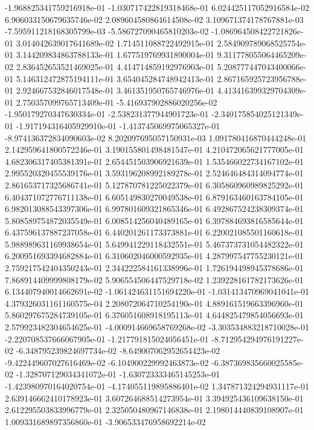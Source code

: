 -1.968825341759216918e-01
-1.030717422819318468e-01
6.024425117052916584e-02
6.906033150679635746e-02
2.089604580864614508e-02
3.109671374178767881e-03
-7.595911218168305799e-03
-5.586727090465810203e-02
-1.086964508422721826e-01
3.014042639017641689e-02
1.714511088722492915e-01
2.584909789068525754e-01
3.144209834863788133e-01
1.677519769931890004e-01
9.311778055064465209e-02
2.836452653521469025e-01
4.414714859192976903e-01
5.208777447043400066e-01
5.146312472875194111e-01
3.654045284748942413e-01
2.867165925723956788e-01
2.924667532846017548e-01
3.461351950765746976e-01
4.413416399329704309e-01
2.750357099765713409e-01
-5.416937902886020256e-02
-1.950179270347630334e-01
-2.538231377944901723e-01
-2.340175854025121349e-01
-1.917194316405929910e-01
-1.413745069975065327e-01
-8.974136372834090603e-02
8.202097695057150931e-03
1.091780416870444248e-01
2.142959641800572246e-01
3.190155801498481547e-01
4.210472065621777005e-01
4.682306317405381391e-01
2.654451503906921639e-01
1.535466022734167102e-01
2.995520320455539176e-01
3.593196208992189278e-01
2.524646484314094774e-01
2.861653717325686741e-01
5.127870781225022379e-01
6.305860960989825292e-01
6.404371072776711138e-01
6.605149830270049538e-01
6.879163460163784105e-01
6.982013088543397306e-01
6.997801609321865346e-01
6.492867524238309374e-01
5.808589754872035549e-01
6.008514256040489165e-01
6.397884693816585644e-01
6.437596137887237058e-01
6.440201261173373881e-01
6.220021085501160618e-01
5.988989631169938654e-01
5.649941229118432551e-01
5.467373731054482322e-01
6.200951693394682884e-01
6.310602046000592935e-01
4.287997547755230121e-01
2.759217542404350243e-01
2.344222584161338996e-01
1.726194498945378686e-01
7.868914409999808179e-02
5.906554506447529718e-02
1.239228161782173626e-01
6.134407940014662691e-02
-1.061424631151694220e-01
-1.031413470969041041e-01
4.379326031161160575e-04
2.208072064710254190e-01
4.889161519663396960e-01
5.860297675284739105e-01
6.376051608918195113e-01
4.644825479854056693e-01
2.579923482304654625e-01
-4.000914669658769268e-02
-3.303534883218710028e-01
-2.220708537666067905e-01
-1.217791815024056451e-01
-8.712954294976191227e-02
-6.348795239824697734e-02
-8.649007062952654423e-02
-9.422449607027616469e-02
-6.104900229992463873e-02
-6.387369835660025585e-02
-1.328707129034341072e-01
-1.630723333465145253e-01
-1.423980970164020754e-01
-4.174055119895886401e-02
1.347871324294931117e-01
2.639146662410178923e-01
3.607264688514273954e-01
3.394925436109638150e-01
2.612295503833996779e-01
2.325050480967146838e-01
2.198014440839108907e-01
1.009331689897356860e-01
-3.906533476958692214e-02
